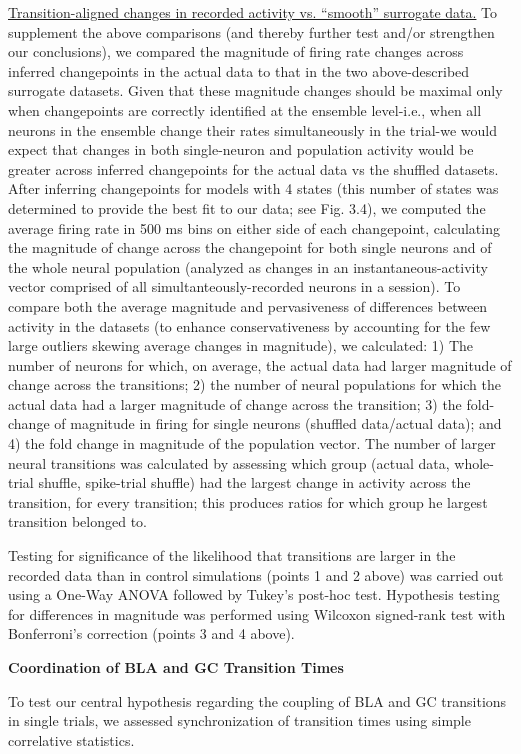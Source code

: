 \begin{refsection}
\noindent\underline{Transition-aligned changes in recorded activity vs. “smooth” surrogate data.} To supplement the above comparisons (and thereby further test and/or strengthen our conclusions), we compared the magnitude of firing rate changes across inferred changepoints in the actual data to that in the two above-described surrogate datasets. Given that these magnitude changes should be maximal only when changepoints are correctly identified at the ensemble level-i.e., when all neurons in the ensemble change their rates simultaneously in the trial-we would expect that changes in both single-neuron and population activity would be greater across inferred changepoints for the actual data vs the shuffled datasets. After inferring changepoints for models with 4 states (this number of states was determined to provide the best fit to our data; see Fig. 3.4), we computed the average firing rate in 500 ms bins on either side of each changepoint, calculating the magnitude of change across the changepoint for both single neurons and of the whole neural population (analyzed as changes in an instantaneous-activity vector comprised of all simultanteously-recorded neurons in a session). To compare both the average magnitude and pervasiveness of differences between activity in the datasets (to enhance conservativeness by accounting for the few large outliers skewing average changes in magnitude), we calculated: 1) The number of neurons for which, on average, the actual data had larger magnitude of change across the transitions; 2) the number of neural populations for which the actual data had a larger magnitude of change across the transition; 3) the fold-change of magnitude in firing for single neurons (shuffled data/actual data); and 4) the fold change in magnitude of the population vector. The number of larger neural transitions was calculated by assessing which group (actual data, whole-trial shuffle, spike-trial shuffle) had the largest change in activity across the transition, for every transition; this produces ratios for which group he largest transition belonged to.

Testing for significance of the likelihood that transitions  are larger in the recorded data than in control simulations (points 1 and 2 above) was carried out using a One-Way ANOVA followed by Tukey’s post-hoc test. Hypothesis testing for differences in magnitude was performed using Wilcoxon signed-rank test with Bonferroni’s correction (points 3 and 4 above). 

\smallskip
\noindent\textbf{Coordination of BLA and GC Transition Times}\par
\noindent To test our central hypothesis regarding the coupling of BLA and GC transitions in single trials, we assessed synchronization of transition times using simple correlative statistics.


\end{refsection}
